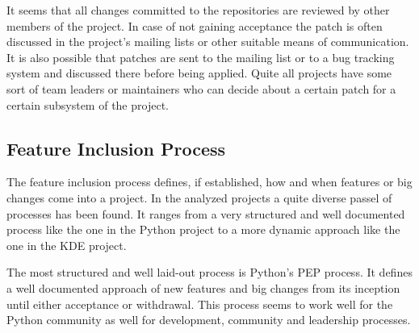 It seems that all changes committed to the repositories are reviewed by other
members of the project. In case of not gaining acceptance the patch is often
discussed in the project's mailing lists or other suitable means of
communication. It is also possible that patches are sent to the mailing list or
to a bug tracking system and discussed there before being applied. Quite all
projects have some sort of team leaders or maintainers who can decide about a
certain patch for a certain subsystem of the project.


\subsection{Feature Inclusion Process} %

The feature inclusion process defines, if established, how and when features or
big changes come into a project. In the analyzed projects a quite diverse
passel of processes has been found. It ranges from a very structured and well
documented process like the one in the Python project to a more dynamic
approach like the one in the KDE project.

The most structured and well laid-out process is Python's \ac{PEP} process. It
defines a well documented approach of new features and big changes from its
inception until either acceptance or withdrawal. This process seems to work
well for the Python community as well for development, community and leadership
processes.

